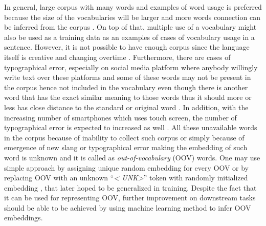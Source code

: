     In general, large corpus with many words and examples of word
    usage is preferred because the size of the vocabularies will be
    larger and more words connection can be inferred from the corpus
    \citep{size2018kutuzov}. On top of that, multiple use of a
    vocabulary might also be used as a training data as an examples of
    cases of vocabulary usage in a sentence. However, it is not
    possible to have enough corpus since the language itself is
    creative and changing overtime \citep{forrester2008abrief,
    speech2009Jurafsky:2009:SLP:1214993}. Furthermore, there are cases
    of typographical error, especially on social media platform where
    anybody willingly write text over these platforms
    \citep{Liu2010SentimentAA} and some of these words may not be
    present in the corpus hence not included in the vocabulary even
    though there is another word that has the exact similar meaning to
    those words thus it should more or less has close distance to the
    standard or original word \citep{mapping2012eisenstein}. In
    addition, with the increasing number of smartphones which uses
    touch screen, the number of typographical error is expected to
    increased as well \citep{ghosh2017correction}. All these
    unavailable words in the corpus because of inability to collect
    such corpus or simply because of emergence of new slang or
    typographical error making the embedding of such word is unknown
    and it is called as \textit{out-of-vocabulary} (OOV) words. One
    may use simple approach by assigning unique random embedding for
    every OOV or by replacing OOV with an unknown ``\textit{\textless
    UNK\textgreater}'' token with randomly initialized embedding
    \citep{predicting2019garneau}, that later hoped to be generalized
    in training. Despite the fact that it can be used for representing
    OOV, further improvement on downstream tasks should be able to be
    achieved by using machine learning method to infer OOV embeddings.

